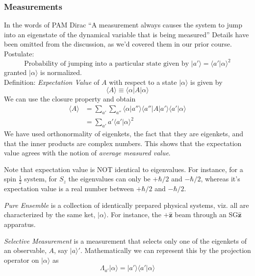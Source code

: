 \documentclass[12pt]{article}
\def\*#1{\boldsymbol{#1}}
\let\oldhat\hat
\renewcommand{\hat}[1]{\oldhat{\*{#1}}}
\def\ket#1{|#1 \rangle}
\def\inpr#1#2{\langle #1|#2 \rangle}
\def\braket#1#2#3{\langle#1|#2|#3\rangle}
\def\expval#1{\langle #1 \rangle}
\begin{document}
			\subsubsection{Measurements}
				In the words of PAM Dirac ``A measurement always causes the system to jump into an eigenstate of the dynamical variable that is being measured'' Details have been omitted from the discussion, as we'd covered them in our prior course.\\
				Postulate: 
				\begin{equation}
					\text{Probability of jumping into a particular state given by } \ket {a'} = \inpr {a'} \alpha ^2
				\end{equation}
				granted $\ket \alpha$ is normalized. \\
				Definition: \emph{Expectation Value} of $A$ with respect to a state $\ket \alpha$ is given by
				\begin{equation}
					 \expval A \equiv \braket \alpha A \alpha
				\end{equation}
				We can use the closure property and obtain
				\begin{align}
					\expval A 	&= \sum_{a'}\sum_{a''} \inpr \alpha {a''} \braket {a''} A {a'} \inpr {a'} \alpha \\
								&= \sum_{a'} a' \inpr {a'} \alpha ^2
				\end{align}
				We have used orthonormality of eigenkets, the fact that they are eigenkets, and that the inner products are complex numbers. This shows that the expectation value agrees with the notion of \emph{average measured value}.
				\par
				Note that expectation value is NOT identical to eigenvalues. For instance, for a spin $\frac 1 2$ system, for $S_z$ the eigenvalues can only be $+\hbar/2$ and $-\hbar/2$, whereas it's expectation value is a real number between $+\hbar/2$ and $-\hbar/2$.
				\par
				\emph{Pure Ensemble} is a collection of identically prepared physical systems, viz. all are characterized by the same ket, $\ket \alpha$. For instance, the $+ \hat z$ beam through an SG$\hat z$ apparatus.
				\par
				\emph{Selective Measurement} is a measurement that selects only one of the eigenkets of an observable, $A$, say $\ket a'$. Mathematically we can represent this by the projection operator on $\ket \alpha$ as
				\begin{equation}
					\Lambda_{a'}\ket \alpha = \ket {a'} \inpr{a'} \alpha
				\end{equation}				
\end{document}

